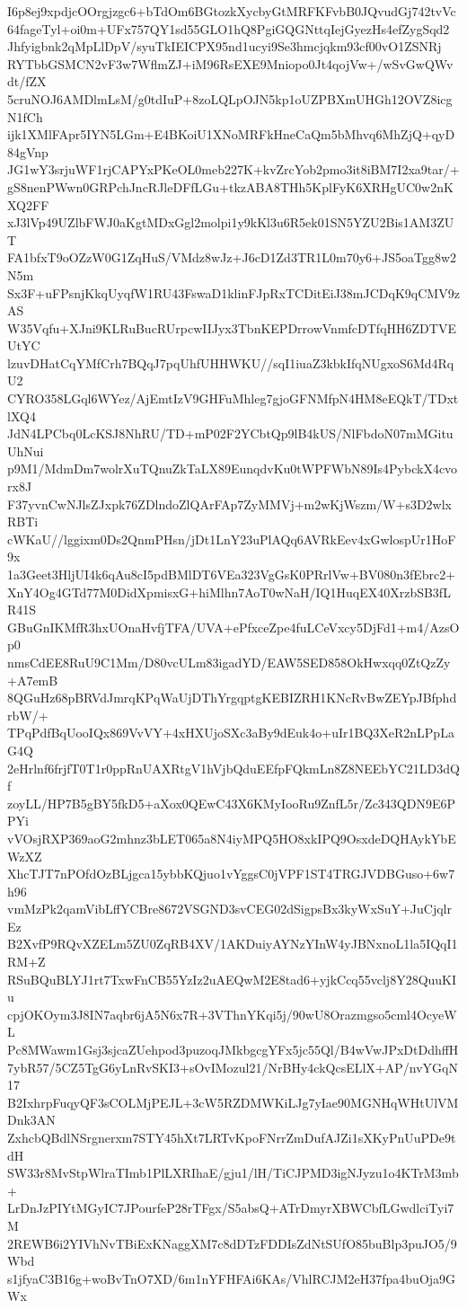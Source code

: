 I6p8ej9xpdjcOOrgjzgc6+bTdOm6BGtozkXycbyGtMRFKFvbB0JQvudGj742tvVc
64fageTyl+oi0m+UFx757QY1sd55GLO1hQ8PgiGQGNttqIejGyezHs4efZygSqd2
Jhfyigbnk2qMpLlDpV/syuTkIEICPX95nd1ucyi9Se3hmcjqkm93cf00vO1ZSNRj
RYTbbGSMCN2vF3w7WflmZJ+iM96RsEXE9Mniopo0Jt4qojVw+/wSvGwQWvdt/fZX
5cruNOJ6AMDlmLsM/g0tdIuP+8zoLQLpOJN5kp1oUZPBXmUHGh12OVZ8icgN1fCh
ijk1XMlFApr5IYN5LGm+E4BKoiU1XNoMRFkHneCaQm5bMhvq6MhZjQ+qyD84gVnp
JG1wY3srjuWF1rjCAPYxPKeOL0meb227K+kvZrcYob2pmo3it8iBM7I2xa9tar/+
gS8nenPWwn0GRPchJncRJleDFfLGu+tkzABA8THh5KplFyK6XRHgUC0w2nKXQ2FF
xJ3lVp49UZlbFWJ0aKgtMDxGgl2molpi1y9kKl3u6R5ek01SN5YZU2Bis1AM3ZUT
FA1bfxT9oOZzW0G1ZqHuS/VMdz8wJz+J6cD1Zd3TR1L0m70y6+JS5oaTgg8w2N5m
Sx3F+uFPsnjKkqUyqfW1RU43FswaD1klinFJpRxTCDitEiJ38mJCDqK9qCMV9zAS
W35Vqfu+XJni9KLRuBucRUrpcwIIJyx3TbnKEPDrrowVnmfcDTfqHH6ZDTVEUtYC
lzuvDHatCqYMfCrh7BQqJ7pqUhfUHHWKU//sqI1iuaZ3kbkIfqNUgxoS6Md4RqU2
CYRO358LGql6WYez/AjEmtIzV9GHFuMhleg7gjoGFNMfpN4HM8eEQkT/TDxtlXQ4
JdN4LPCbq0LcKSJ8NhRU/TD+mP02F2YCbtQp9lB4kUS/NlFbdoN07mMGituUhNui
p9M1/MdmDm7wolrXuTQnuZkTaLX89EunqdvKu0tWPFWbN89Is4PybckX4cvorx8J
F37yvnCwNJlsZJxpk76ZDlndoZlQArFAp7ZyMMVj+m2wKjWszm/W+s3D2wlxRBTi
cWKaU//lggixm0Ds2QnmPHsn/jDt1LnY23uPlAQq6AVRkEev4xGwlospUr1HoF9x
1a3Geet3HljUI4k6qAu8cI5pdBMlDT6VEa323VgGsK0PRrlVw+BV080n3fEbrc2+
XnY4Og4GTd77M0DidXpmisxG+hiMlhn7AoT0wNaH/IQ1HuqEX40XrzbSB3fLR41S
GBuGnIKMfR3hxUOnaHvfjTFA/UVA+ePfxceZpe4fuLCeVxcy5DjFd1+m4/AzsOp0
nmsCdEE8RuU9C1Mm/D80vcULm83igadYD/EAW5SED858OkHwxqq0ZtQzZy+A7emB
8QGuHz68pBRVdJmrqKPqWaUjDThYrgqptgKEBIZRH1KNcRvBwZEYpJBfphdrbW/+
TPqPdfBqUooIQx869VvVY+4xHXUjoSXc3aBy9dEuk4o+uIr1BQ3XeR2nLPpLaG4Q
2eHrlnf6frjfT0T1r0ppRnUAXRtgV1hVjbQduEEfpFQkmLn8Z8NEEbYC21LD3dQf
zoyLL/HP7B5gBY5fkD5+aXox0QEwC43X6KMyIooRu9ZnfL5r/Zc343QDN9E6PPYi
vVOsjRXP369aoG2mhnz3bLET065a8N4iyMPQ5HO8xkIPQ9OsxdeDQHAykYbEWzXZ
XhcTJT7nPOfdOzBLjgca15ybbKQjuo1vYggsC0jVPF1ST4TRGJVDBGuso+6w7h96
vmMzPk2qamVibLffYCBre8672VSGND3svCEG02dSigpsBx3kyWxSuY+JuCjqlrEz
B2XvfP9RQvXZELm5ZU0ZqRB4XV/1AKDuiyAYNzYInW4yJBNxnoL1la5IQqI1RM+Z
RSuBQuBLYJ1rt7TxwFnCB55YzIz2uAEQwM2E8tad6+yjkCcq55vclj8Y28QuuKIu
cpjOKOym3J8IN7aqbr6jA5N6x7R+3VThnYKqi5j/90wU8Orazmgso5cml4OcyeWL
Pc8MWawm1Gsj3sjcaZUehpod3puzoqJMkbgcgYFx5jc55Ql/B4wVwJPxDtDdhffH
7ybR57/5CZ5TgG6yLnRvSKI3+sOvIMozul21/NrBHy4ckQcsELlX+AP/nvYGqN17
B2IxhrpFuqyQF3sCOLMjPEJL+3cW5RZDMWKiLJg7yIae90MGNHqWHtUlVMDnk3AN
ZxhcbQBdlNSrgnerxm7STY45hXt7LRTvKpoFNrrZmDufAJZi1sXKyPnUuPDe9tdH
SW33r8MvStpWlraTImb1PlLXRIhaE/gju1/lH/TiCJPMD3igNJyzu1o4KTrM3mb+
LrDnJzPIYtMGyIC7JPourfeP28rTFgx/S5absQ+ATrDmyrXBWCbfLGwdlciTyi7M
2REWB6i2YIVhNvTBiExKNaggXM7c8dDTzFDDIsZdNtSUfO85buBlp3puJO5/9Wbd
s1jfyaC3B16g+woBvTnO7XD/6m1nYFHFAi6KAs/VhlRCJM2eH37fpa4buOja9GWx
